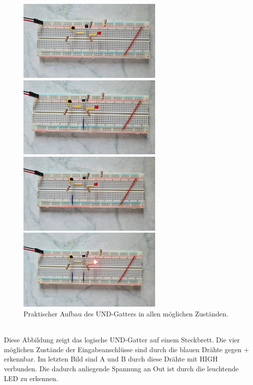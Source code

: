 \begin{figure}[h!]
	\begin{minipage}{.5\textwidth}
		\centering
		\includegraphics[height=4cm, keepaspectratio]{./Fotos/UND-00.jpg}
		\vspace{1cm}
	\end{minipage}%
	\begin{minipage}{.5\textwidth}
		\centering
		\includegraphics[height=4cm, keepaspectratio]{./Fotos/UND-01.jpg}
		\vspace{1cm}
	\end{minipage}
	\begin{minipage}{.5\textwidth}
		\centering
		\includegraphics[height=4cm, keepaspectratio]{./Fotos/UND-10.jpg}
	\end{minipage}%
	\begin{minipage}{.5\textwidth}
		\centering
		\includegraphics[height=4cm, keepaspectratio]{./Fotos/UND-11.jpg}
	\end{minipage}
	\caption{Praktischer Aufbau des UND-Gatters in allen möglichen Zuständen.}
\end{figure}\\
Diese Abbildung zeigt das logische UND-Gatter auf einem Steckbrett. Die vier möglichen Zustände der Eingabeanschlüsse sind durch die blauen Drähte gegen \glqq{}+\grqq{} erkennbar. Im letzten Bild sind A und B durch diese Drähte mit HIGH verbunden. Die dadurch anliegende Spannung an Out ist durch die leuchtende LED zu erkennen.

